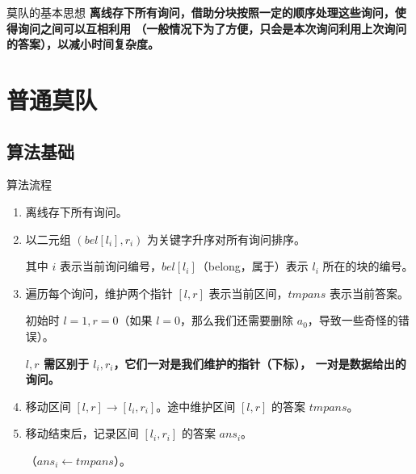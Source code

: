 \documentclass[table]{beamer}
\begin{document}
\begin{frame}{莫队的基本思想}\Large
	\textbf{离线存下所有询问，借助分块按照一定的顺序处理这些询问，使得询问之间可以互相利用
	（一般情况下为了方便，只会是本次询问利用上次询问的答案），以减小时间复杂度。}
\end{frame}

\section{普通莫队}

\subsection{算法基础}

\begin{frame}{算法流程}
	\begin{enumerate}
		\item 离线存下所有询问。
		\pause

		\item 以二元组 $(bel[l_i],r_i)$ 为关键字升序对所有询问排序。
		
		其中 $i$ 表示当前询问编号，$bel[l_i]$（belong，属于）表示 $l_i$ 所在的块的编号。
		\pause

		\item 遍历每个询问，维护两个指针 $[l,r]$ 表示当前区间，$tmpans$ 表示当前答案。
		
		初始时 $l=1,r=0$（如果 $l=0$，那么我们还需要删除 $a_0$，导致一些奇怪的错误）。
		
		\textbf{$l,r$ 需区别于 $l_i,r_i$，它们一对是我们维护的指针（下标），
		一对是数据给出的询问。}
		\pause

		\item 移动区间 $[l,r]\to [l_i,r_i]$。途中维护区间 $[l,r]$ 的答案 $tmpans$。
		\pause

		\item 移动结束后，记录区间 $[l_i,r_i]$ 的答案 $ans_i$。
		
		（$ans_i\gets tmpans$）。
	\end{enumerate}
\end{frame}
\end{document}
